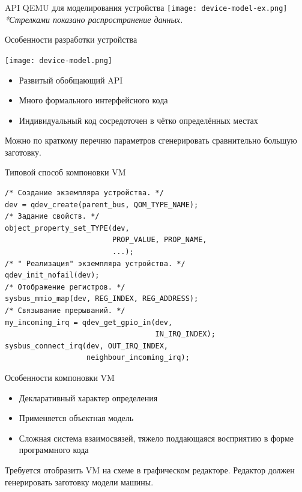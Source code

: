 \documentclass[unicode,hyperref={unicode=true}]{beamer}
\theoremstyle{definition}
\theoremstyle{plain}
\begin{document}
\begin{frame}{API QEMU для моделирования устройства}
\texttt{[image: device-model-ex.png]}
\vfill
\it{*Стрелками показано распространение данных.}
\end{frame}



\begin{frame}{Особенности разработки устройства}

\begin{minipage}{0.6\textwidth}
\texttt{[image: device-model.png]}
\end{minipage}
\begin{minipage}{0.38\textwidth}
\begin{itemize}
\item Развитый обобщающий API
\item Много формального интерфейсного кода
\item Индивидуальный код сосредоточен в чётко определённых местах
\end{itemize}
\end{minipage}

\begin{center}
Можно по краткому перечню параметров сгенерировать сравнительно большую
заготовку.
\end{center}

\end{frame}


\begin{frame}[fragile]{Типовой способ компоновки VM}
\lstset{language=C}
\begin{lstlisting}
/* Создание экземпляра устройства. */
dev = qdev_create(parent_bus, QOM_TYPE_NAME);
/* Задание свойств. */
object_property_set_TYPE(dev,
                         PROP_VALUE, PROP_NAME,
                         ...);
/* " Реализация" экземпляра устройства. */
qdev_init_nofail(dev);
/* Отображение регистров. */
sysbus_mmio_map(dev, REG_INDEX, REG_ADDRESS);
/* Связывание прерываний. */
my_incoming_irq = qdev_get_gpio_in(dev,
                                   IN_IRQ_INDEX);
sysbus_connect_irq(dev, OUT_IRQ_INDEX,
                   neighbour_incoming_irq);
\end{lstlisting}
\end{frame}


\begin{frame}{Особенности компоновки VM}

\begin{itemize}
\item Декларативный характер определения
\item Применяется объектная модель
\item Сложная система взаимосвязей, тяжело поддающаяся восприятию в форме
программного кода
\end{itemize}

\begin{center}
Требуется отобразить VM на схеме в графическом редакторе.
Редактор должен генерировать заготовку модели машины.
\end{center}

\end{frame}
\end{document}

